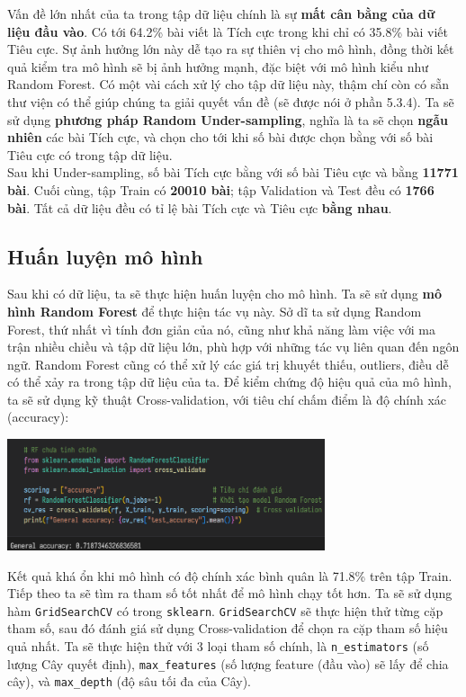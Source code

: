 Vấn đề lớn nhất của ta trong tập dữ liệu chính là sự \textbf{mất cân bằng của dữ liệu đầu vào}. Có tới 64.2\% bài viết là Tích cực trong khi chỉ có 35.8\% bài viết Tiêu cực. Sự ảnh hưởng lớn này dễ tạo ra sự thiên vị cho mô hình, đồng thời kết quả kiểm tra mô hình sẽ bị ảnh hưởng mạnh, đặc biệt với mô hình kiểu như Random Forest. Có một vài cách xử lý cho tập dữ liệu này, thậm chí còn có sẵn thư viện có thể giúp chúng ta giải quyết vấn đề (sẽ được nói ở phần 5.3.4). Ta sẽ sử dụng \textbf{phương pháp Random Under-sampling}, nghĩa là ta sẽ chọn \textbf{ngẫu nhiên} các bài Tích cực, và chọn cho tới khi số bài được chọn bằng với số bài Tiêu cực có trong tập dữ liệu.\\

Sau khi Under-sampling, số bài Tích cực bằng với số bài Tiêu cực và bằng \textbf{11771 bài}. Cuối cùng, tập Train có \textbf{20010 bài}; tập Validation và Test đều có \textbf{1766 bài}. Tất cả dữ liệu đều có tỉ lệ bài Tích cực và Tiêu cực \textbf{bằng nhau}.

\subsection{Huấn luyện mô hình}
Sau khi có dữ liệu, ta sẽ thực hiện huấn luyện cho mô hình. Ta sẽ sử dụng \textbf{mô hình Random Forest} để thực hiện tác vụ này. Sở dĩ ta sử dụng Random Forest, thứ nhất vì tính đơn giản của nó, cũng như khả năng làm việc với ma trận nhiều chiều và tập dữ liệu lớn, phù hợp với những tác vụ liên quan đến ngôn ngữ. Random Forest cũng có thể xử lý các giá trị khuyết thiếu, outliers, điều dễ có thể xảy ra trong tập dữ liệu của ta. Để kiểm chứng độ hiệu quả của mô hình, ta sẽ sử dụng kỹ thuật Cross-validation, với tiêu chí chấm điểm là độ chính xác (accuracy):

\begin{center}
\includegraphics[width=0.7\textwidth]{images/code-5.10-rf1cv.png}
\end{center}

Kết quả khá ổn khi mô hình có độ chính xác bình quân là 71.8\% trên tập Train.\\

Tiếp theo ta sẽ tìm ra tham số tốt nhất để mô hình chạy tốt hơn. Ta sẽ sử dụng hàm \texttt{GridSearchCV} có trong \texttt{sklearn}. \texttt{GridSearchCV} sẽ thực hiện thử từng cặp tham số, sau đó đánh giá sử dụng Cross-validation để chọn ra cặp tham số hiệu quả nhất. Ta sẽ thực hiện thử với 3 loại tham số chính, là \texttt{n\_estimators} (số lượng Cây quyết định), \texttt{max\_features} (số lượng feature (đầu vào) sẽ lấy để chia cây), và \texttt{max\_depth} (độ sâu tối đa của Cây).

